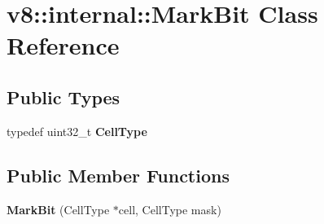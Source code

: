 \hypertarget{classv8_1_1internal_1_1_mark_bit}{}\section{v8\+:\+:internal\+:\+:Mark\+Bit Class Reference}
\label{classv8_1_1internal_1_1_mark_bit}
\subsection*{Public Types}
\begin{DoxyCompactItemize}
\item 
typedef uint32\+\_\+t {\bfseries Cell\+Type}\hypertarget{classv8_1_1internal_1_1_mark_bit_a05d951ad2b52f7096758d8c3cbf15ac3}{}\label{classv8_1_1internal_1_1_mark_bit_a05d951ad2b52f7096758d8c3cbf15ac3}

\end{DoxyCompactItemize}
\subsection*{Public Member Functions}
\begin{DoxyCompactItemize}
\item 
{\bfseries Mark\+Bit} (Cell\+Type $\ast$cell, Cell\+Type mask)\hypertarget{classv8_1_1internal_1_1_mark_bit_a4f7426d997f3cd933036f09132b01ed6}{}\label{classv8_1_1internal_1_1_mark_bit_a4f7426d997f3cd933036f09132b01ed6}

\end{DoxyCompactItemize}
